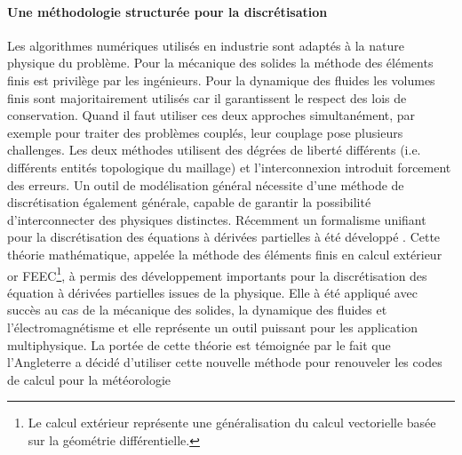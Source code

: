 \documentclass[12pt, french]{article}
\begin{document}
\paragraph{\large Une méthodologie structurée pour la discrétisation \\}
Les algorithmes numériques utilisés en industrie sont adaptés à la nature physique du problème. Pour la mécanique des solides la méthode des éléments finis est privilège par les ingénieurs. Pour la dynamique des fluides les volumes finis sont majoritairement utilisés car il garantissent le respect des lois de conservation. Quand il faut utiliser ces deux approches simultanément, par exemple pour traiter des problèmes couplés, leur couplage pose plusieurs challenges. Les deux méthodes utilisent des dégrées de liberté différents (i.e. différents entités topologique du maillage) et l'interconnexion introduit forcement des erreurs. Un outil de modélisation général nécessite d'une méthode de discrétisation également générale, capable de  garantir la possibilité d'interconnecter des physiques distinctes. Récemment un formalisme unifiant pour la discrétisation des équations à dérivées partielles  à été développé  \cite{arnold2006acta}. Cette théorie mathématique, appelée la méthode des éléments finis en calcul extérieur or FEEC\footnote{Le calcul extérieur représente une généralisation du calcul vectorielle basée sur la géométrie différentielle.}, à permis des développement importants pour la discrétisation des équation à dérivées partielles issues de la physique. Elle à été appliqué avec succès au cas de la mécanique des solides, la dynamique des fluides et l'électromagnétisme et elle représente un outil puissant pour les application multiphysique. La portée de cette théorie est témoignée par le fait que l'Angleterre a décidé d'utiliser cette nouvelle méthode pour renouveler les codes de calcul pour la météorologie 
\end{document}
